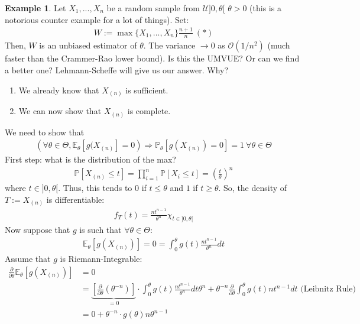 \documentclass[11pt]{scrartcl}
\theoremstyle{definition}
\newtheorem{ex}{Example}
\theoremstyle{remark}
\newcommand{\pr}[1]{\mathbb{P}\left[#1 \right]}
\newcommand{\EXth}[1]{\mathbb{E}_\theta \left[ #1 \right]}
\newcommand{\idx}[2]{\int_{#1}^{#2}}
\begin{document}
{\begin{ex} 
	Let $X_1, ..., X_n$ be a random sample from $\mathcal{U} ]0, \theta [$ $\theta > 0$ (this is a notorious counter example for a lot of things). Set: 
	\begin{align*}
		W := \max \{ X_1, ..., X_n\} \frac{n+1}{n}\ (*) 
	\end{align*}	
	Then, $W$ is an unbiased estimator of $\theta$. The variance $\rightarrow 0$ as $\mathcal{O}(1/n^2)$ (much faster than the Crammer-Rao lower bound). Is this the UMVUE? Or can we find a better one? Lehmann-Scheffe will give us our answer. Why?
	\begin{enumerate}[noitemsep]
		\item We already know that $X_{(n)}$ is sufficient. 
		\item We can now show that $X_{(n)}$ is complete.
	\end{enumerate}
	We need to show that 
	\begin{align*}
		( \forall \theta \in \Theta, \EXth{g(X_{(n)}} = 0) \Rightarrow \mathbb{P}_\theta [g(X_{(n)}) =0 ] =1\ \forall \theta \in \Theta 
	\end{align*}
	First step: what is the distribution of the max? 
	\begin{align*}
		\pr{X_{(n)} \leq t} = \prod_{i=1}^n \pr{X_i \leq t} = \left( \frac{t}{\theta} \right)^n 
	\end{align*} 
	where $t \in ]0, \theta[$. Thus, this tends to $0$ if $ t \leq \theta$ and $1$ if $t \geq \theta$. So, the density of $T := X_{(n)}$ is differentiable: 
	\begin{align*}
		f_T(t) = \frac{nt^{n-1}}{\theta^n} \chi_{t \in ]0, \theta[} 
	\end{align*}
	Now suppose that $g$ is such that $\forall \theta \in \Theta$: 
	\begin{align*}
		\EXth{g(X_{(n)}) } = 0 = \idx{0}{\theta} g(t) \frac{nt^{n-1}}{\theta^n} dt 
	\end{align*}
	Assume that $g$ is Riemann-Integrable: 
	\begin{align*}
			\frac{\partial}{\partial \theta} \EXth{g(X_{(n)})} & = 0 \\
			& = \underbrace{\left[ 	\frac{\partial}{\partial \theta} (\theta^{-n}) 		\right]}_{= 0} \cdot \idx{0}{\theta} g(t) \frac{nt^{n-1}}{\theta^n} dt \theta^n + \theta^{-n} \frac{\partial}{\partial \theta} \idx{0}{\theta} g(t) n t^{n-1} dt  \text{ (Leibnitz Rule)} \\
			& = 0 + \theta^{-n} \cdot g(\theta)n \theta^{n-1} 
	\end{align*}

\end{ex}}
\end{document}
